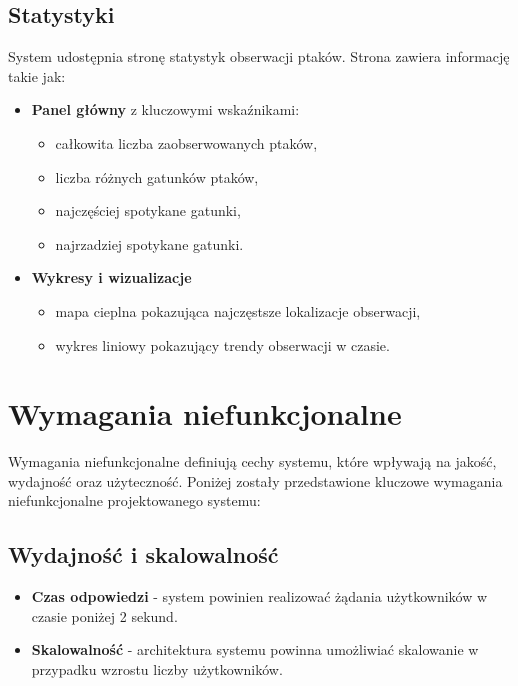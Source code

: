 \subsection{Statystyki}
System udostępnia stronę statystyk obserwacji ptaków. Strona zawiera informację takie jak:
\begin{itemize}
	\item \textbf{Panel główny} z kluczowymi wskaźnikami:
		\begin{itemize}
			\item całkowita liczba zaobserwowanych ptaków,
			\item liczba różnych gatunków ptaków,
			\item najczęściej spotykane gatunki,
			\item najrzadziej spotykane gatunki.
		\end{itemize}
	\item \textbf{Wykresy i wizualizacje}
		\begin{itemize}
			\item mapa cieplna pokazująca najczęstsze lokalizacje obserwacji,
			\item wykres liniowy pokazujący trendy obserwacji w czasie.
		\end{itemize}
\end{itemize}

\section{Wymagania niefunkcjonalne}

Wymagania niefunkcjonalne definiują cechy systemu, które wpływają na jakość, wydajność oraz użyteczność. Poniżej zostały przedstawione kluczowe wymagania niefunkcjonalne projektowanego systemu:

\subsection{Wydajność i skalowalność}
\begin{itemize}
	\item \textbf{Czas odpowiedzi} - system powinien realizować żądania użytkowników w czasie poniżej 2 sekund.
	\item \textbf{Skalowalność} - architektura systemu powinna umożliwiać skalowanie w przypadku wzrostu liczby użytkowników.
\end{itemize}

